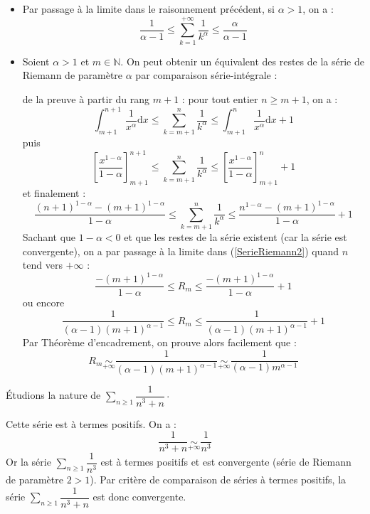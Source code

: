 \documentclass[french,11pt,twoside]{VcCours}
\newcommand{\dx}{\text{d}x}
\newcommand{\Sum}[2]{\ensuremath{\textstyle{\sum\limits_{#1}^{#2}}}}
\begin{document}
\begin{Remarques}{}
	\begin{itemize}
		\item Par passage à la limite dans le raisonnement précédent, si $\alpha>1$, on a :
$$ \frac{1}{\alpha-1} \leq \sum_{k=1}^{+ \infty} \frac{1}{k^{\alpha}} \leq  \frac{\alpha}{\alpha-1}$$
\item Soient $\alpha >1$ et $m \in \mathbb{N}$. On peut obtenir un équivalent des restes de la série de Riemann de paramètre $\alpha$ par comparaison série-intégrale :

de la preuve à partir du rang $m+1$ : pour tout entier $n \geq m+1$, on a :
$$\int_{m+1}^{n+1} \frac{1}{x^{\alpha}} \dx \leq \sum_{k=m+1}^n \frac{1}{k^{\alpha}} \leq \int_{m+1}^{n} \frac{1}{x^{\alpha}} \dx +1$$
puis 
$$ \left[ \frac{x^{1-\alpha}}{1- \alpha} \right]_{m+1}^{n+1}  \leq \sum_{k=m+1}^n \frac{1}{k^{\alpha}} \leq  \left[ \frac{x^{1-\alpha}}{1- \alpha} \right]_{m+1}^{n} + 1 $$
et finalement :
\begin{equation}\label{SerieRiemann2}
\frac{(n+1)^{1-\alpha}-(m+1)^{1-\alpha}}{1 - \alpha} \leq \sum_{k=m+1}^n \frac{1}{k^{\alpha}} \leq   \frac{n^{1-\alpha}-(m+1)^{1-\alpha}}{1 - \alpha} + 1
\end{equation}
Sachant que $1- \alpha<0$ et que les restes de la série existent (car la série est convergente), on a par passage à la limite dans (\ref{SerieRiemann2}) quand $n$ tend vers $+ \infty$ :
$$  \frac{-(m+1)^{1-\alpha}}{1 - \alpha} \leq R_m \leq   \frac{-(m+1)^{1-\alpha}}{1 - \alpha} + 1$$
ou encore 
$$ \frac{1}{(\alpha-1)(m+1)^{\alpha-1}} \leq R_m \leq \frac{1}{(\alpha-1)(m+1)^{\alpha-1}} + 1$$
Par Théorème d'encadrement, on prouve alors facilement que :
$$ R_m \underset{+ \infty}{\sim}  \frac{1}{(\alpha-1)(m+1)^{\alpha-1}} \underset{+ \infty}{\sim}  \frac{1}{(\alpha-1)m^{\alpha-1}}$$


\end{itemize}
\end{Remarques}

\begin{Exemple} Étudions la nature de $\Sum{n \geq 1}{} \dfrac{1}{n^3+n} \cdot$


Cette série est à termes positifs. On a :
$$ \frac{1}{n^3+n} \underset{+ \infty}{\sim} \frac{1}{n^3}$$
Or la série $\Sum{n \geq 1}{} \dfrac{1}{n^3}$ est à termes positifs et est convergente (série de Riemann de paramètre $2>1$). Par critère de comparaison de séries à termes positifs, la série $\Sum{n \geq 1}{} \dfrac{1}{n^3+n}$ est donc convergente.
\end{Exemple}
\end{document}
